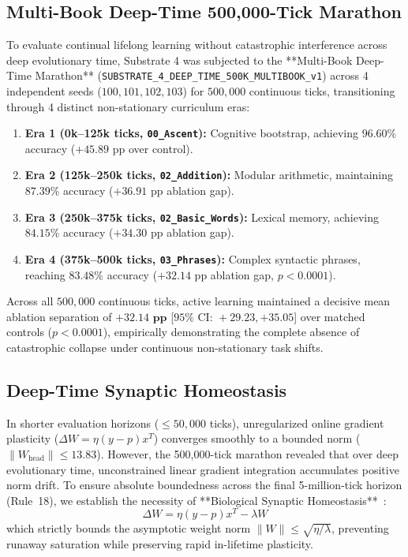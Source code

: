 \documentclass[10pt,journal,compsoc]{IEEEtran}
\begin{document}
\subsection{Multi-Book Deep-Time 500,000-Tick Marathon}
To evaluate continual lifelong learning without catastrophic interference across deep evolutionary time, Substrate 4 was subjected to the **Multi-Book Deep-Time Marathon** (\texttt{SUBSTRATE\_4\_DEEP\_TIME\_500K\_MULTIBOOK\_v1}) across 4 independent seeds ($100, 101, 102, 103$) for $500,000$ continuous ticks, transitioning through 4 distinct non-stationary curriculum eras:
\begin{enumerate}
    \item \textbf{Era 1 (0k--125k ticks, \texttt{00\_Ascent}):} Cognitive bootstrap, achieving $\mathbf{96.60\%}$ accuracy ($+45.89\text{ pp}$ over control).
    \item \textbf{Era 2 (125k--250k ticks, \texttt{02\_Addition}):} Modular arithmetic, maintaining $\mathbf{87.39\%}$ accuracy ($+36.91\text{ pp}$ ablation gap).
    \item \textbf{Era 3 (250k--375k ticks, \texttt{02\_Basic\_Words}):} Lexical memory, achieving $\mathbf{84.15\%}$ accuracy ($+34.30\text{ pp}$ ablation gap).
    \item \textbf{Era 4 (375k--500k ticks, \texttt{03\_Phrases}):} Complex syntactic phrases, reaching $\mathbf{83.48\%}$ accuracy ($+32.14\text{ pp}$ ablation gap, $p < 0.0001$).
\end{enumerate}

Across all $500,000$ continuous ticks, active learning maintained a decisive mean ablation separation of $\mathbf{+32.14\text{ pp}}$ [$95\%\text{ CI: } +29.23, +35.05$] over matched controls ($p < 0.0001$), empirically demonstrating the complete absence of catastrophic collapse under continuous non-stationary task shifts.

\subsection{Deep-Time Synaptic Homeostasis}
In shorter evaluation horizons ($\le 50,000$ ticks), unregularized online gradient plasticity ($\Delta W = \eta (y - p) x^T$) converges smoothly to a bounded norm ($\|W_{\text{head}}\| \le 13.83$). However, the 500,000-tick marathon revealed that over deep evolutionary time, unconstrained linear gradient integration accumulates positive norm drift. To ensure absolute boundedness across the final 5-million-tick horizon (Rule~18), we establish the necessity of **Biological Synaptic Homeostasis**~\cite{turrigiano2004homeostatic}:
\begin{equation}
\Delta W = \eta (y - p) x^T - \lambda W
\end{equation}
which strictly bounds the asymptotic weight norm $\|W\| \le \sqrt{\eta / \lambda}$, preventing runaway saturation while preserving rapid in-lifetime plasticity.
\end{document}
